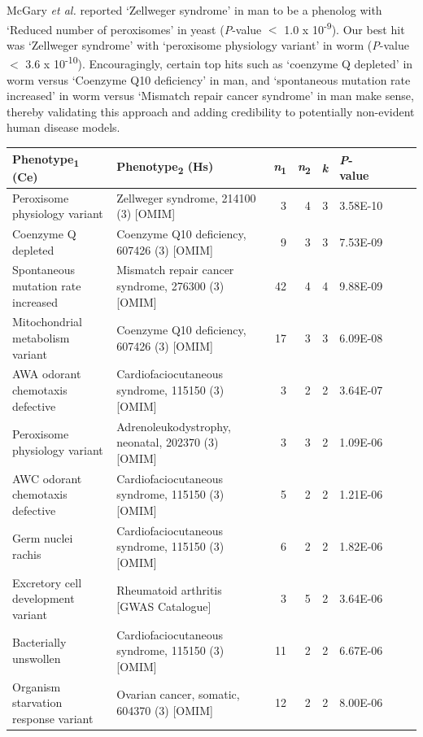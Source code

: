 McGary \textsl{et al.} \cite{McGary_2010} reported ‘Zellweger syndrome’ in man to be a phenolog with ‘Reduced number of peroxisomes’ in yeast (\textsl{P}-value $<$ 1.0 x 10\textsuperscript{-9}).
Our best hit was ‘Zellweger syndrome’ with ‘peroxisome physiology variant’ in worm (\textsl{P}-value $<$ 3.6 x 10\textsuperscript{-10}).
Encouragingly, certain top hits such as ‘coenzyme Q depleted’ in worm versus ‘Coenzyme Q10 deficiency’ in man, and ‘spontaneous mutation rate increased’ in worm versus ‘Mismatch repair cancer syndrome’ in man make sense, thereby validating this approach and adding credibility to potentially non-evident human disease models.

\begin{table}
\footnotesize
\begin{tabulary}{\linewidth}{LLRRRL}
  Phenotype\textsubscript{1} (Ce) & Phenotype\textsubscript{2} (Hs) & \textsl{n}\textsubscript{1} & \textsl{n}\textsubscript{2} & \textsl{k} & \mbox{\textsl{P}-value~~~~~~} \\
  \hline
  Peroxisome physiology variant & Zellweger syndrome, 214100 (3) [OMIM] & 3 & 4 & 3 & 3.58E-10 \\
  Coenzyme Q depleted & Coenzyme Q10 deficiency, 607426 (3) [OMIM] & 9 & 3 & 3 & 7.53E-09 \\
  Spontaneous mutation rate increased & Mismatch repair cancer syndrome, 276300 (3) [OMIM] & 42 & 4 & 4 & 9.88E-09 \\
  Mitochondrial metabolism variant & Coenzyme Q10 deficiency, 607426 (3) [OMIM] & 17 & 3 & 3 & 6.09E-08 \\
  AWA odorant chemotaxis defective & Cardiofaciocutaneous syndrome, 115150 (3) [OMIM] & 3 & 2 & 2 & 3.64E-07 \\
  Peroxisome physiology variant & Adrenoleukodystrophy, neonatal, 202370 (3) [OMIM] & 3 & 3 & 2 & 1.09E-06 \\
  AWC odorant chemotaxis defective & Cardiofaciocutaneous syndrome, 115150 (3) [OMIM] & 5 & 2 & 2 & 1.21E-06 \\
  Germ nuclei rachis & Cardiofaciocutaneous syndrome, 115150 (3) [OMIM] & 6 & 2 & 2 & 1.82E-06 \\
  Excretory cell development variant & Rheumatoid arthritis [GWAS Catalogue] & 3 & 5 & 2 & 3.64E-06 \\
  Bacterially unswollen & Cardiofaciocutaneous syndrome, 115150 (3) [OMIM] & 11 & 2 & 2 & 6.67E-06 \\
  Organism starvation response variant & Ovarian cancer, somatic, 604370 (3) [OMIM] & 12 & 2 & 2 & 8.00E-06 \\

\end{tabulary}
\end{table}

